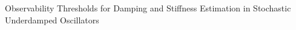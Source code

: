 \documentclass[]{article}
\begin{document}
Observability Thresholds for Damping and Stiffness Estimation in Stochastic Underdamped Oscillators
\end{document}
